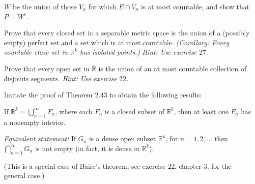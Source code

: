 \begin{exercise}
{    \(W\) be the union of those \(V_n\) for which \(E\cap V_n\) is at most
    countable, and show that \(P = W^c\).}
\item
  Prove that every closed set in a separable metric space is the union of a
  (possibly empty) perfect set and a set which is at most countable.
  \textit{(Corollary: Every countable close set in \(\mathbb{R}^k\) has
    isolated points.)
    Hint: Use exercise \(27\).}
\item
  \label{2.29}
  Prove that every open set in \(\mathbb{R}\) is the union of an at most
  countable collection of disjoints segments.
  \textit{Hint: Use exercise \(22\).}
\item
  Imitate the proof of Theorem \(2.43\) to obtain the following results:
  \par\smallskip
  If \(\mathbb{R}^k = \bigcup_{n = 1}^{\infty}F_n\), where each \(F_n\) is a
  closed subset of \(\mathbb{R}^k\), then at least one \(F_n\) has a nonempty
  interior.
  \par\smallskip
  \textit{Equivalent statement:} If \(G_n\) is a dense open subset
  \(\mathbb{R}^k\), for \(n = 1,2,\ldots\) then
  \(\bigcap_{n = 1}^{\infty}G_n\) is not empty (in fact, it is dense in
  \(\mathbb{R}^k\)).
  \par\smallskip
  (This is a special case of Baire's theorem; see exercise \(22\), chapter
  \(3\), for the general case.)
\end{exercise}


